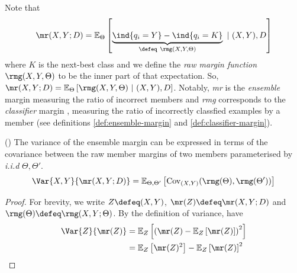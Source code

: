 \documentclass[
    a4paper, %
	fontsize=10pt, %
	twoside=false, %
]{kaobook}
\begin{document}
\begin{titlepage}

Note that
$$
\mr(X, Y;D) = \mathbb{E}_{\Theta}\left[ 
\underbrace{
\ind{q_{i}=Y} - \ind{q_{i}=K} 
}_{
\defeq ~\rmg(X, Y, \Theta) 
}
~|~(X,Y), D \right] 
$$
where $K$ is the next-best class and we define the \textit{raw margin function} $\rmg(X, Y, \Theta)$ to be the inner part of that expectation. So, 
$\mr(X, Y;D) = \mathbb{E}_{\Theta}\left[ 
\rmg(X, Y, \Theta) 
~|~(X,Y), D \right]$. Notably, \textit{mr} is the \textit{ensemble} margin measuring the ratio of incorrect members and \textit{rmg} corresponds to the \textit{classifier} margin
, measuring the ratio of incorrectly classfied examples by a member (see definitions \ref{def:ensemble-margin} and \ref{def:classifier-margin}).

\begin{theorem} (\cite{breiman_RandomForests_2001})
The variance of the ensemble margin can be expressed in terms of the covariance between the raw member margins of two members parameterised by \textit{i.i.d} $\Theta, \Theta'$.
	$$
	\Var{X,Y}{\mr(X,Y;D)} = \mathbb{E}_{\Theta, \Theta'}\left[ \text{Cov}_{(X,Y)}(\rmg(\Theta), \rmg(\Theta') ) \right] 
	$$
\end{theorem}
\begin{proof}
	For brevity, we write
	  $Z \defeq (X,Y)$,
	 $\mr(Z) \defeq \mr(X,Y;D)$ and
	 $\rmg(\Theta) \defeq \rmg(X,Y;\Theta)$.
By the definition of variance, have
\begin{align*}
\Var{Z}{\mr(Z)} &= \mathbb{E}_{Z}\left[ \left(\mr(Z) - \mathbb{E}_{Z}\left[ \mr(Z) \right]\right) ^2 \right]  \\
&= \mathbb{E}_{Z}\left[ \mr(Z)^2 \right] - \mathbb{E}_{Z}\left[ \mr(Z) \right] ^2 \\
\end{align*}


\end{proof}
\end{titlepage}
\end{document}
